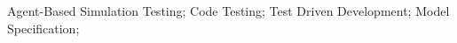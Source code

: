 \documentclass[]{interact}
\theoremstyle{plain}%
\theoremstyle{definition}
\theoremstyle{remark}
\begin{document}
\begin{keywords}
Agent-Based Simulation Testing; Code Testing; Test Driven Development; Model Specification;
\end{keywords}























\end{document}
